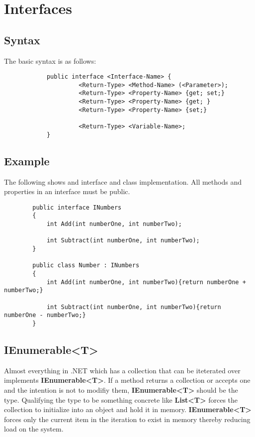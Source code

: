 \documentclass {amsart}
\begin{document}
\section{Interfaces}
	\subsection{Syntax} The basic syntax is as follows: 
		\begin{verbatim}
			public interface <Interface-Name> {
				     <Return-Type> <Method-Name> (<Parameter>);
				     <Return-Type> <Property-Name> {get; set;}
				     <Return-Type> <Property-Name> {get; }
				     <Return-Type> <Property-Name> {set;}

				     <Return-Type> <Variable-Name>;
			}
		\end{verbatim} 
	\subsection{Example}  The following shows and interface and class implementation.  All methods and properties in an interface must be public. 

	\begin{lstlisting}
		public interface INumbers
		{
			int Add(int numberOne, int numberTwo);

			int Subtract(int numberOne, int numberTwo);
		}

		public class Number : INumbers
		{
			int Add(int numberOne, int numberTwo){return numberOne + numberTwo;}

			int Subtract(int numberOne, int numberTwo){return numberOne - numberTwo;}
		}

	\end{lstlisting}


	\subsection{IEnumerable\textless T\textgreater}  Almost everything in .NET which has a collection that can be iteterated over implements {\bf IEnumerable\textless T\textgreater}.  If a method returns a collection or accepts one and the intention is not to modifiy them, {\bf IEnumerable\textless T\textgreater} should be the type.  Qualifying the type to be something concrete like {\bf List\textless T\textgreater} forces the collection to initialize into an object and hold it in memory.  {\bf IEnumerable\textless T\textgreater} forces only the current item in the iteration to exist in memory thereby reducing load on the system.  
\end{document}
